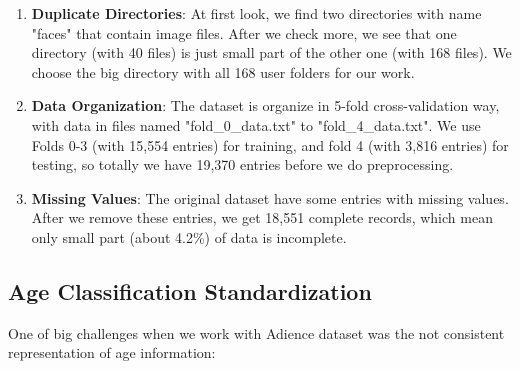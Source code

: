 \documentclass{article}
\begin{document}
\begin{enumerate}
    \item \textbf{Duplicate Directories}: At first look, we find two directories with name "faces" that contain image files. After we check more, we see that one directory (with 40 files) is just small part of the other one (with 168 files). We choose the big directory with all 168 user folders for our work.
    
    \item \textbf{Data Organization}: The dataset is organize in 5-fold cross-validation way, with data in files named "fold\_0\_data.txt" to "fold\_4\_data.txt". We use Folds 0-3 (with 15,554 entries) for training, and fold 4 (with 3,816 entries) for testing, so totally we have 19,370 entries before we do preprocessing.
    
    \item \textbf{Missing Values}: The original dataset have some entries with missing values. After we remove these entries, we get 18,551 complete records, which mean only small part (about 4.2\%) of data is incomplete.
\end{enumerate}


\subsection{Age Classification Standardization}
One of big challenges when we work with Adience dataset was the not consistent representation of age information:
\end{document}
